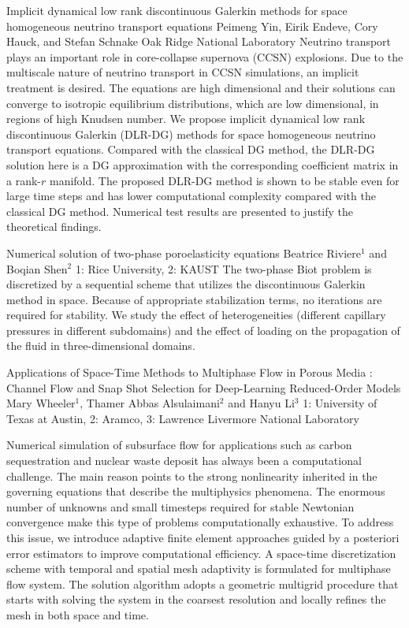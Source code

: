 \begin{addmargin}[2em]{0em}
\vspace{1.5ex}
\abs
{Implicit dynamical low rank discontinuous Galerkin methods for space homogeneous neutrino transport equations}
{Peimeng Yin, Eirik Endeve, Cory Hauck, and Stefan Schnake}
{Oak Ridge National Laboratory}
{Neutrino transport plays an important role in core-collapse supernova (CCSN) explosions. Due to the multiscale nature of neutrino transport in CCSN simulations, an implicit treatment is desired. The equations are high dimensional and their solutions can converge to isotropic equilibrium distributions, which are low dimensional, in regions of high Knudsen number. We propose implicit dynamical low rank discontinuous Galerkin (DLR-DG) methods for space homogeneous neutrino transport equations. Compared with the classical DG method, the DLR-DG solution here is a DG approximation with the corresponding coefficient matrix in a rank-$r$ manifold. The proposed DLR-DG method is shown to be stable even for large time steps and has lower computational complexity compared with the classical DG method. Numerical test results are presented to justify the theoretical findings.}


\vspace{1.5ex}
\abs
{Numerical solution of two-phase poroelasticity equations}
{Beatrice Riviere$^{1}$ and Boqian Shen$^{2}$}
{1: Rice University, 2: KAUST}
{The two-phase Biot problem is discretized by a sequential scheme that utilizes the discontinuous Galerkin method in space. Because of appropriate stabilization terms, no iterations are required for stability. We study the effect of heterogeneities (different capillary pressures in different subdomains) and the effect of loading on the propagation of the fluid in three-dimensional domains.}


\vspace{1.5ex}
\abs
{Applications of Space-Time Methods to Multiphase Flow in Porous Media  :  Channel Flow and  Snap Shot Selection for Deep-Learning Reduced-Order Models }
{Mary Wheeler$^{1}$, Thamer  Abbas Alsulaimani$^{2}$ and Hanyu Li$^{3}$}
{1: University of Texas at Austin, 2: Aramco, 3: Lawrence Livermore National Laboratory}
{Numerical simulation of subsurface flow for applications such as carbon sequestration and nuclear waste deposit has always been a computational challenge. The main reason points to the strong nonlinearity inherited in the governing equations that describe the multiphysics phenomena. The enormous number of unknowns and small timesteps required for stable Newtonian convergence make this type of problems computationally exhaustive. To address this issue, we introduce adaptive finite element approaches guided by a posteriori error estimators to improve computational efficiency. A space-time discretization scheme with temporal and spatial mesh adaptivity is formulated for multiphase flow system. The solution algorithm adopts a geometric multigrid procedure that starts with solving the system in the coarsest resolution and locally refines the mesh in both space and time.

}
\end{addmargin}
